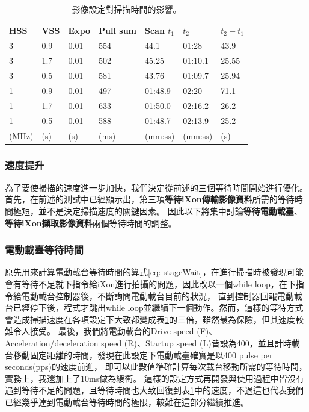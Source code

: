 \documentclass[12pt]{article}
\begin{document}
\begin{table}[]
    \centering
    \begin{tabular}{lll||llll}
        HSS   & VSS & Expo & Pull sum & Scan $t_1$ & $t_2$   & $t_2-t_1$ \\ \hline \hline
        3     & 0.9 & 0.01 & 554      & 44.1       & 01:28   & 43.9      \\ \hline
        3     & 1.7 & 0.01 & 502      & 45.25      & 01:10.1 & 25.55     \\ \hline
        3     & 0.5 & 0.01 & 581      & 43.76      & 01:09.7 & 25.94     \\ \hline
        1     & 0.9 & 0.01 & 497      & 01:48.9    & 02:20   & 71.1      \\ \hline
        1     & 1.7 & 0.01 & 633      & 01:50.0    & 02:16.2 & 26.2      \\ \hline
        1     & 0.5 & 0.01 & 588      & 01:48.7    & 02:13.9 & 25.2      \\
        (MHz) & (s) & (s)  & (ms)     & (mm:ss)    & (mm:ss) & (s)
    \end{tabular}
    \caption{影像設定對掃描時間的影響。}
    \label{tab: measuring}
\end{table}
\subsubsection{速度提升}
為了要使掃描的速度進一步加快，我們決定從前述的三個等待時間開始進行優化。首先，在前述的測試中已經顯示出，第三項\textbf{\CJKsans 等待iXon傳輸影像資料}所需的等待時間極短，並不是決定掃描速度的關鍵因素。
因此以下將集中討論\textbf{\CJKsans 等待電動載臺}、\textbf{\CJKsans 等待iXon擷取影像資料}兩個等待時間的調整。
\subsubsection{電動載臺等待時間}
原先用來計算電動載台等待時間的算式\ref{eq: stageWait}，在進行掃描時被發現可能會有等待不足就下指令給iXon進行拍攝的問題，因此改以一個while loop，在下指令給電動載台控制器後，不斷詢問電動載台目前的狀況，
直到控制器回報電動載台已經停下後，程式才跳出while loop並繼續下一個動作。然而，這樣的等待方式會造成掃描速度在各項設定下大致都變成表\ref{tab: measuring}的三倍，雖然最為保險，但其速度較難令人接受。
最後，我們將電動載台的Drive speed (F)、Acceleration/deceleration speed (R)、Startup speed (L)皆設為400，並且計時載台移動固定距離的時間，發現在此設定下電動載臺確實是以400 pulse per seconds(pps)的速度前進，
即可以此數值準確計算每次載台移動所需的等待時間，實務上，我還加上了10ms做為緩衝。
這樣的設定方式再開發與使用過程中皆沒有遇到等待不足的問題，且等待時間也大致回復到表\ref{tab: measuring}中的速度，不過這也代表我們已經幾乎達到電動載台等待時間的極限，較難在這部分繼續推進。
\end{document}
